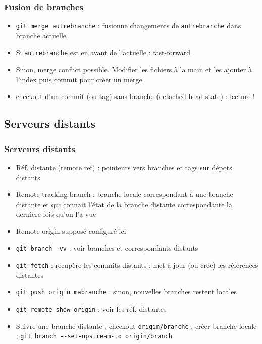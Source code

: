 \documentclass[english, french]{beamer}
\begin{document}
\begin{frame}
	\frametitle{Fusion de branches}
	{
	\centering
	\par
	}
	\begin{itemize}
		\item \texttt{git merge autrebranche} : fusionne changements de \texttt{autrebranche} dans branche actuelle
		\item Si \texttt{autrebranche} est en avant de l’actuelle : \og{}fast-forward\fg{}
		\item Sinon, \og{}merge conflict\fg{} possible. Modifier les fichiers à la main et les ajouter à l’index puis commit pour créer un merge.
		\item checkout d’un commit {\tiny (ou tag)} sans branche {\tiny (detached head state)} : lecture !
	\end{itemize}
\end{frame}

\subsection{Serveurs distants}
\begin{frame}
	\frametitle{Serveurs distants}
	\vspace{-1pt}
	\begin{itemize}
		\item Réf. distante (\og{}remote ref\fg{}) : pointeurs vers branches {\tiny et tags} sur dépots distants
		\item \og{}Remote-tracking branch\fg{} : branche locale correspondant à une branche distante et qui connait l’état de la branche distante correspondante la dernière fois qu’on l’a vue
		\item Remote \og{}origin\fg{} supposé configuré ici
		\item \texttt{git branch -vv} : voir branches et correspondants distants
		\item \texttt{git fetch} : récupère les commits distants ; met à jour (ou crée) les références distantes
		\item \texttt{git push origin mabranche} : sinon, nouvelles branches restent locales
		\item \texttt{git remote show origin} : voir les réf. distantes
		\item Suivre une branche distante : checkout \texttt{origin/branche} ; créer branche locale ; \texttt{git branch -{}-set-upstream-to origin/branch}
	\end{itemize}
\end{frame}
\end{document}
